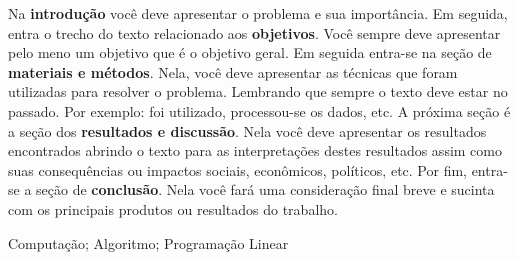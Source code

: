 \documentclass{modelo_resumo_simples}
\begin{document}
	\construirtitulo

	\construirautores
	
	\begin{resumo}
	Na \textbf{introdução} você deve apresentar o problema e sua importância. Em seguida, entra o trecho do texto relacionado aos \textbf{objetivos}. Você sempre deve apresentar pelo meno um objetivo que é o objetivo geral.
	Em seguida entra-se na seção de \textbf{materiais e métodos}. Nela, você deve apresentar as técnicas que foram utilizadas para resolver o problema. Lembrando que sempre o texto deve estar no passado. Por exemplo: foi utilizado, processou-se os dados, etc.
	A próxima seção é a seção dos \textbf{resultados e discussão}. Nela você deve apresentar os resultados encontrados abrindo o texto para as interpretações destes resultados assim como suas consequências ou impactos sociais, econômicos, políticos, etc.
	Por fim, entra-se a seção de \textbf{conclusão}. Nela você fará uma consideração final breve e sucinta com os principais produtos ou resultados do trabalho.
	\end{resumo}
	
	\begin{palavras_chave}
	Computação; Algoritmo; Programação Linear
	\end{palavras_chave}
\end{document}
